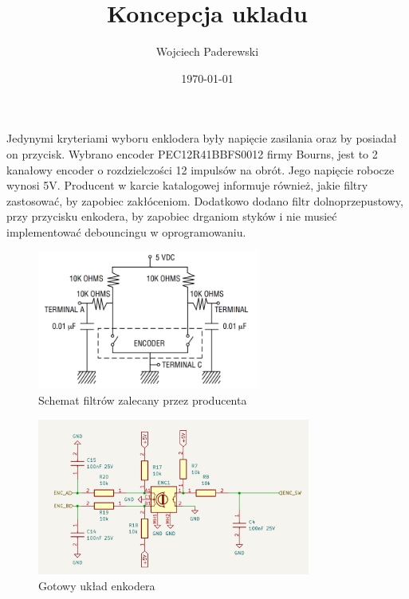 \documentclass[../../main.tex]{subfiles}
\author{Wojciech Paderewski}
\date{\today}
\title{Koncepcja ukladu}
\begin{document}
Jedynymi kryteriami wyboru enklodera były napięcie zasilania oraz by posiadał on przycisk.
Wybrano encoder PEC12R\-41BBF\-S0012 firmy Bourns\cite{st:encoder}, jest to 2 kanałowy encoder o rozdzielczości 12 impulsów na obrót. 
Jego napięcie robocze wynosi 5V. Producent w karcie katalogowej informuje również, jakie filtry zastosować, by zapobiec zakłóceniom.
Dodatkowo dodano filtr dolnoprzepustowy, przy przycisku enkodera, by zapobiec drganiom  styków i nie musieć implementować debouncingu w oprogramowaniu.

\begin{figure}[H]
    \centering
    \includegraphics[width=0.65\textwidth]{encoder_karta.png}
    \caption{Schemat filtrów zalecany przez producenta\cite{st:encoder}}
\end{figure}

\begin{figure}[H]
    \centering
    \includegraphics[width=0.8\textwidth]{encoder.png}
    \caption{Gotowy układ enkodera}
\end{figure}
\end{document}
